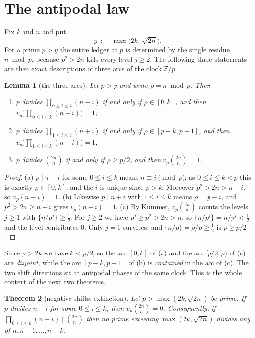 \documentclass[11pt]{article}
\newtheorem{theorem}{Theorem}
\newtheorem{lemma}[theorem]{Lemma}
\begin{document}
\section{The antipodal law}

Fix $k$ and $n$ and put
\[
  y\ :=\ \max\bigl(2k,\ \sqrt{2n}\bigr).
\]
For a prime $p>y$ the entire ledger at $p$ is determined by the single residue
$n\bmod p$, because $p^{2}>2n$ kills every level $j\ge2$.  The following three statements
are then exact descriptions of three arcs of the clock $\mathbb Z/p$.

\begin{lemma}[the three arcs]\label{lem:arcs}
Let $p>y$ and write $\rho=n\bmod p$.  Then
\begin{enumerate}
\item[(a)] $p$ divides $\prod_{0\le i\le k}(n-i)$ if and only if $\rho\in[0,k]$, and then
      $v_p\bigl(\prod_{0\le i\le k}(n-i)\bigr)=1$;
\item[(b)] $p$ divides $\prod_{1\le i\le k}(n+i)$ if and only if $\rho\in[p-k,p-1]$, and
      then $v_p\bigl(\prod_{1\le i\le k}(n+i)\bigr)=1$;
\item[(c)] $p$ divides $\binom{2n}{n}$ if and only if $\rho\ge p/2$, and then
      $v_p\binom{2n}{n}=1$.
\end{enumerate}
\end{lemma}

\begin{proof}
(a) $p\mid n-i$ for some $0\le i\le k$ means $n\equiv i\pmod p$; as $0\le i\le k<p$ this is
exactly $\rho\in[0,k]$, and the $i$ is unique since $p>k$.  Moreover $p^{2}>2n>n-i$, so
$v_p(n-i)=1$.  (b) Likewise $p\mid n+i$ with $1\le i\le k$ means $\rho=p-i$, and
$p^{2}>2n\ge n+i$ gives $v_p(n+i)=1$.  (c) By Kummer, $v_p\binom{2n}{n}$ counts the levels
$j\ge1$ with $\{n/p^{j}\}\ge\frac12$.  For $j\ge2$ we have $p^{j}\ge p^{2}>2n>n$, so
$\{n/p^{j}\}=n/p^{j}<\frac12$ and the level contributes $0$.  Only $j=1$ survives, and
$\{n/p\}=\rho/p\ge\frac12$ is $\rho\ge p/2$.
\end{proof}

Since $p>2k$ we have $k<p/2$, so the arc $[0,k]$ of (a) and the arc $[p/2,p)$ of (c) are
\emph{disjoint}, while the arc $[p-k,p-1]$ of (b) is \emph{contained} in the arc of (c).
The two shift directions sit at antipodal phases of the same clock.  This is the whole
content of the next two theorems.

\begin{theorem}[negative shifts: extinction]\label{thm:neg}
Let $p>\max(2k,\sqrt{2n})$ be prime.  If $p$ divides $n-i$ for some $0\le i\le k$, then
$v_p\binom{2n}{n}=0$.  Consequently, if $\prod_{0\le i\le k}(n-i)\mid\binom{2n}{n}$ then
no prime exceeding $\max(2k,\sqrt{2n})$ divides any of $n,n-1,\dots,n-k$.
\end{theorem}
\end{document}
